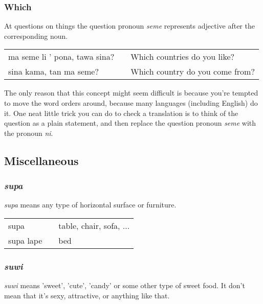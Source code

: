 \subsubsection*{Which}
%
At questions on things the question pronoun \textit{seme} represents adjective after the corresponding noun. 

\begin{supertabular}{p{5,5cm}|ll}
ma seme li ' pona, tawa sina? && Which countries do you like? \\
sina kama, tan ma seme? && Which country do you come from? \\ 
\end{supertabular} 

The only reason that this concept might seem difficult is because you're tempted to move the word orders around, because many languages (including English) do it. 
One neat little trick you can do to check a translation is to think of the question as a plain statement, and then replace the question pronoun \textit{seme} with the pronoun \textit{ni}. 
%
%
%
\subsection*{Miscellaneous}
%
\subsubsection*{\textit{supa}}
%
\textit{supa} means any type of horizontal surface or furniture. 

\begin{supertabular}{p{5,5cm}|ll}
supa  && table, chair, sofa, ...  \\
supa lape &&  bed \\
\end{supertabular} 

%
\subsubsection*{\textit{suwi}}
%
\textit{suwi} means 'sweet', 'cute', 'candy' or some other type of sweet food. 
It don't mean that it's sexy, attractive, or anything like that. 

